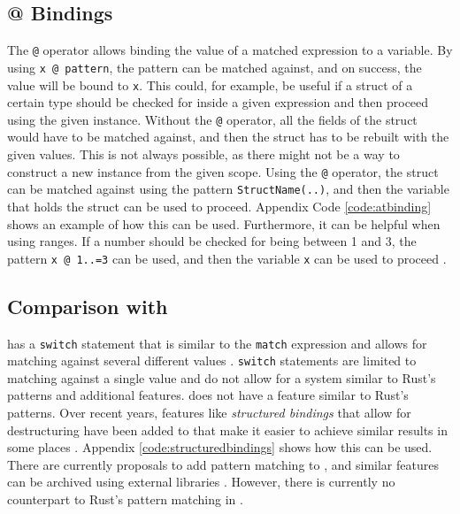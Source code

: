 \subsection{@ Bindings}
\noindent The \texttt{@} operator allows binding the value of a matched expression to a variable.
By using \texttt{x @ pattern}, the pattern can be matched against, and on success, the value will be bound to \texttt{x}.
This could, for example, be useful if a struct of a certain type should be checked for inside a given expression and then proceed using the given instance.
Without the \texttt{@} operator, all the fields of the struct would have to be matched against, and then the struct has to be rebuilt with the given values.
This is not always possible, as there might not be a way to construct a new instance from the given scope.
Using the \texttt{@} operator, the struct can be matched against using the pattern \texttt{StructName(..)}, and then the variable that holds the struct can be used to proceed.
Appendix Code \ref{code:atbinding} shows an example of how this can be used.
Furthermore, it can be helpful when using ranges.
If a number should be checked for being between 1 and 3, the pattern \texttt{x @ 1..=3} can be used, and then the variable \texttt{x} can be used to proceed \cite[248-249]{Blandy_Jim2021-07-20} \cite[Chapter~18.3]{rustbook}.


\subsection{Comparison with \Cpp}
\Cpp has a \texttt{switch} statement that is similar to the \texttt{match} expression and allows for matching against several different values \cite[178-179]{Lippman_Stanley_B_2012-08-06}.
\texttt{switch} statements are limited to matching against a single value and do not allow for a system similar to Rust's patterns and additional features.
\Cpp does not have a feature similar to Rust's patterns.
Over recent years, features like \textit{structured bindings} that allow for destructuring have been added to \Cpp that make it easier to achieve similar results in some places \cite[41-42]{Stroustrup_Bjarne2014-05-15}.
Appendix \ref{code:structuredbindings} shows how this can be used.
There are currently proposals to add pattern matching to \Cpp \cite{p1371r3} \cite{p2392r1}, and similar features can be archived using external libraries \cite{mach7}. However, there is currently no counterpart to Rust's pattern matching in \Cpp.
